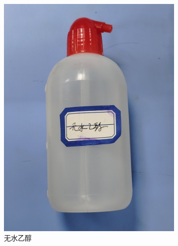 \documentclass[a4paper]{report} %
\begin{document}
\begin{figure}[H]
\begin{subfigure}{0.22\textwidth}
        \includegraphics[width=\linewidth]{无水乙醇.jpg}
        \caption{无水乙醇}
    \end{subfigure}
    \begin{subfigure}{0.22\textwidth}

\end{subfigure}
\end{figure}
\end{document}
